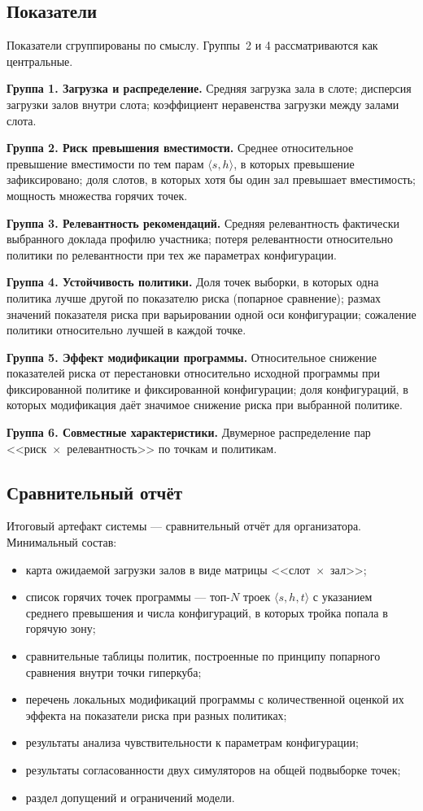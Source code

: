 \subsection{Показатели}

Показатели сгруппированы по смыслу. Группы~2 и 4 рассматриваются как центральные.

\textbf{Группа 1. Загрузка и распределение.} Средняя загрузка зала в слоте; дисперсия загрузки залов внутри слота; коэффициент неравенства загрузки между залами слота.

\textbf{Группа 2. Риск превышения вместимости.} Среднее относительное превышение вместимости по тем парам $\langle s, h \rangle$, в которых превышение зафиксировано; доля слотов, в которых хотя бы один зал превышает вместимость; мощность множества горячих точек.

\textbf{Группа 3. Релевантность рекомендаций.} Средняя релевантность фактически выбранного доклада профилю участника; потеря релевантности относительно политики по релевантности при тех же параметрах конфигурации.

\textbf{Группа 4. Устойчивость политики.} Доля точек выборки, в которых одна политика лучше другой по показателю риска (попарное сравнение); размах значений показателя риска при варьировании одной оси конфигурации; сожаление политики относительно лучшей в каждой точке.

\textbf{Группа 5. Эффект модификации программы.} Относительное снижение показателей риска от перестановки относительно исходной программы при фиксированной политике и фиксированной конфигурации; доля конфигураций, в которых модификация даёт значимое снижение риска при выбранной политике.

\textbf{Группа 6. Совместные характеристики.} Двумерное распределение пар <<риск~$\times$~релевантность>> по точкам и политикам.


\subsection{Сравнительный отчёт}

Итоговый артефакт системы --- сравнительный отчёт для организатора. Минимальный состав:

\begin{itemize}
\item карта ожидаемой загрузки залов в виде матрицы <<слот~$\times$~зал>>;
\item список горячих точек программы --- топ-$N$ троек $\langle s, h, t \rangle$ с указанием среднего превышения и числа конфигураций, в которых тройка попала в горячую зону;
\item сравнительные таблицы политик, построенные по принципу попарного сравнения внутри точки гиперкуба;
\item перечень локальных модификаций программы с количественной оценкой их эффекта на показатели риска при разных политиках;
\item результаты анализа чувствительности к параметрам конфигурации;
\item результаты согласованности двух симуляторов на общей подвыборке точек;
\item раздел допущений и ограничений модели.
\end{itemize}

